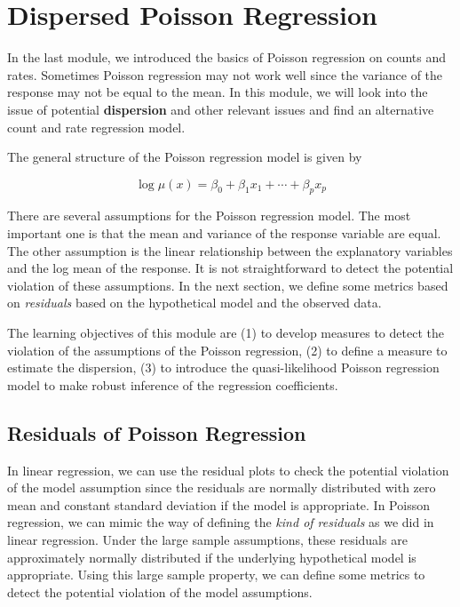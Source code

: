 \documentclass[
]{book}
\begin{document}
\hypertarget{dispersed-poisson-regression}{%
\chapter{Dispersed Poisson Regression}\label{dispersed-poisson-regression}}

In the last module, we introduced the basics of Poisson regression on counts and rates. Sometimes Poisson regression may not work well since the variance of the response may not be equal to the mean. In this module, we will look into the issue of potential \textbf{dispersion} and other relevant issues and find an alternative count and rate regression model.

The general structure of the Poisson regression model is given by

\[
\log \mu(x) = \beta_0 + \beta_1 x_1 + \cdots + \beta_p x_p
\]

There are several assumptions for the Poisson regression model. The most important one is that the mean and variance of the response variable are equal. The other assumption is the linear relationship between the explanatory variables and the log mean of the response. It is not straightforward to detect the potential violation of these assumptions. In the next section, we define some metrics based on \emph{residuals} based on the hypothetical model and the observed data.

The learning objectives of this module are (1) to develop measures to detect the violation of the assumptions of the Poisson regression, (2) to define a measure to estimate the dispersion, (3) to introduce the quasi-likelihood Poisson regression model to make robust inference of the regression coefficients.

\hypertarget{residuals-of-poisson-regression}{%
\section{Residuals of Poisson Regression}\label{residuals-of-poisson-regression}}

In linear regression, we can use the residual plots to check the potential violation of the model assumption since the residuals are normally distributed with zero mean and constant standard deviation if the model is appropriate. In Poisson regression, we can mimic the way of defining the \emph{kind of residuals} as we did in linear regression. Under the large sample assumptions, these residuals are approximately normally distributed if the underlying hypothetical model is appropriate. Using this large sample property, we can define some metrics to detect the potential violation of the model assumptions.
\end{document}
